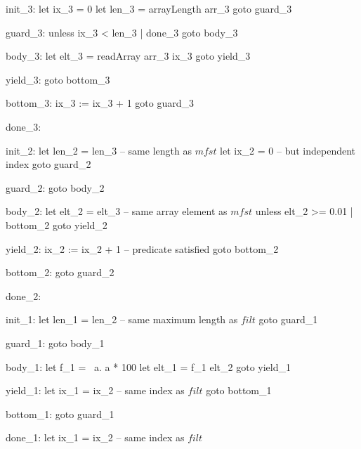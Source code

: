 \documentclass[preamble.tex]{subfiles}
\begin{document}




\begin{loopcode}[%
]
init_3:
  let ix_3 = 0
  let len_3 = arrayLength arr_3
  goto guard_3

guard_3:
  unless ix_3 < len_3 | done_3
  goto body_3

body_3:
  let elt_3 = readArray arr_3 ix_3
  goto yield_3

yield_3:
  goto bottom_3

bottom_3:
  ix_3 := ix_3 + 1
  goto guard_3

done_3:
\end{loopcode}

\begin{loopcode}[%
]
init_2:
  let len_2 = len_3 -- same length as $\mathit{mfst}$
  let ix_2 = 0      -- but independent index
  goto guard_2

guard_2:
  goto body_2

body_2:
  let elt_2 = elt_3 -- same array element as $\mathit{mfst}$
  unless elt_2 >= 0.01 | bottom_2
  goto yield_2

yield_2:
  ix_2 := ix_2 + 1  -- predicate satisfied
  goto bottom_2

bottom_2:
  goto guard_2

done_2:
\end{loopcode}

\begin{loopcode}[%
]
init_1:
  let len_1 = len_2 -- same maximum length as $\mathit{filt}$
  goto guard_1

guard_1:
  goto body_1

body_1:
  let f_1 = \ a. a * 100
  let elt_1 = f_1 elt_2
  goto yield_1

yield_1:
  let ix_1 = ix_2  -- same index as $\mathit{filt}$
  goto bottom_1

bottom_1:
  goto guard_1

done_1:
  let ix_1 = ix_2  -- same index as $\mathit{filt}$
\end{loopcode}
\end{document}
